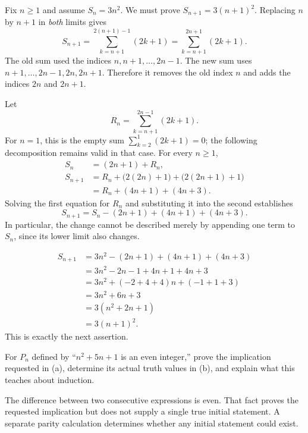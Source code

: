 Fix $n\geq1$ and assume $S_n=3n^2$. We must prove
$S_{n+1}=3(n+1)^2$. Replacing $n$ by $n+1$ in \emph{both} limits gives
\[
 S_{n+1}
 =\sum_{k=n+1}^{2(n+1)-1}(2k+1)
 =\sum_{k=n+1}^{2n+1}(2k+1).
\]
The old sum used the indices $n,n+1,\ldots,2n-1$. The new sum uses
$n+1,\ldots,2n-1,2n,2n+1$. Therefore it removes the old index $n$
and adds the indices $2n$ and $2n+1$.

Let
\[
 R_n=\sum_{k=n+1}^{2n-1}(2k+1).
\]
For $n=1$, this is the empty sum $\sum_{k=2}^{1}(2k+1)=0$;
the following decomposition remains valid in that case. For every $n\geq1$,
\begin{align*}
 S_n&=(2n+1)+R_n,\\
 S_{n+1}&=R_n+\bigl(2(2n)+1\bigr)+\bigl(2(2n+1)+1\bigr)\\
 &=R_n+(4n+1)+(4n+3).
\end{align*}
Solving the first equation for $R_n$ and substituting it into the second
establishes
\[
 S_{n+1}=S_n-(2n+1)+(4n+1)+(4n+3).
\]
In particular, the change cannot be described merely by appending one
term to $S_n$, since its lower limit also changes.

\begin{align*}
 S_{n+1}
 &=3n^2-(2n+1)+(4n+1)+(4n+3)\\
 &=3n^2-2n-1+4n+1+4n+3\\
 &=3n^2+(-2+4+4)n+(-1+1+3)\\
 &=3n^2+6n+3\\
 &=3(n^2+2n+1)\\
 &=3(n+1)^2.
\end{align*}
This is exactly the next assertion.



\goal For $P_n$ defined by ``$n^2+5n+1$ is an even integer,'' prove
the implication requested in (a), determine its actual truth values in
(b), and explain what this teaches about induction.

\idea The difference between two consecutive expressions is even.
That fact proves the requested implication but does not supply a single
true initial statement. A separate parity calculation determines whether
any initial statement could exist.

